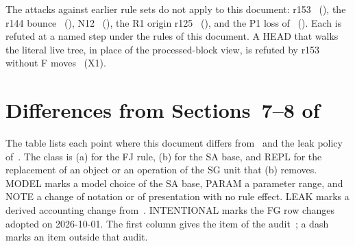 \documentclass{article}
\theoremstyle{plain}
\theoremstyle{definition}
\theoremstyle{remark}
\newcommand{\DC}[1]{\cite[\S#1]{DC}}
\newcommand{\FJ}[1]{\cite[\S#1]{FJ}}
\newcommand{\LDP}[1]{\cite[\S#1]{LDP}}
\newcommand{\LV}[1]{\cite[\S#1]{LV}}
\begin{document}
The attacks against earlier rule sets do not apply to this document:
r153~\cite{REACH} (\LDP{5.1}), the r144 bounce~\cite{NONJ} (\LDP{5.2}),
N12~\FJ{7} (\LDP{5.3}), the R1 origin r125~\cite{PCS}
(\LDP{5.4}), and the P1 loss of~\LV{3} (\LDP{10}).  Each is refuted at a
named step under the rules of this document.  A HEAD that walks the
literal live tree, in place of the processed-block view, is refuted by
r153 without F moves~\LDP{5.1} (X1).

\section{\texorpdfstring{Differences from Sections~7--8 of~\cite{DC}}{Differences from DC Sections 7--8}}\label{sec:differences}

The table lists each point where this document differs from~\DC{7}
and the leak policy of~\DC{8}.
The class is (a) for the FJ rule, (b) for the SA base, and REPL for the
replacement of an object or an operation of the SG unit that (b)
removes.  MODEL marks a model choice of the SA base, PARAM a parameter
range, and NOTE a change of notation or of presentation with no rule
effect.  LEAK marks a derived accounting change from~\DC{8}.
INTENTIONAL marks the FG row changes adopted on 2026-10-01.
The first column gives the item of the audit~\LV{2}; a dash marks
an item outside that audit.
\end{document}
